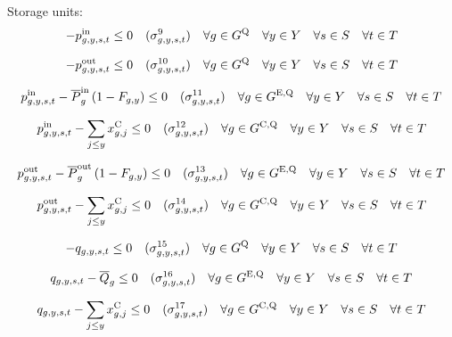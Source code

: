 \documentclass{article}
\newcommand{\sScenarioSets}{\quad \forall \iYear \in \sYears \quad \forall \iScenario \in \sScenarios \quad \forall \iInterval \in \sIntervals}
\begin{document}
Storage units:
\begin{equation}
	-\vPowerIn \leq 0 \quad (\dNonNegativeCharging) \quad \forall \iGenerator \in \sStorage \sScenarioSets
\end{equation}

\begin{equation}
	-\vPowerOut \leq 0 \quad (\dNonNegativeDischarging) \quad \forall \iGenerator \in \sStorage \sScenarioSets
\end{equation}

\begin{equation}
	\vPowerIn - \cPowerChargingMax \left(1 - \cRetirementIndicator\right) \leq 0 \quad (\dMaxChargingRateExisting) \quad \forall \iGenerator \in \sStorageExisting \sScenarioSets
\end{equation}

\begin{equation}
	\vPowerIn - \sum\limits_{\iYearAlias \leq \iYear} \vInstalledCapacity[\iGenerator,\iYearAlias] \leq 0 \quad (\dMaxChargingRateCandidate) \quad \forall \iGenerator \in \sStorageCandidate \sScenarioSets
\end{equation}

\begin{equation}
	\vPowerOut - \cPowerDischargingMax \left(1 - \cRetirementIndicator\right) \leq 0 \quad (\dMaxDischargingRateExisting) \quad \forall \iGenerator \in \sStorageExisting \sScenarioSets
\end{equation}

\begin{equation}
	\vPowerOut - \sum\limits_{\iYearAlias \leq \iYear} \vInstalledCapacity[\iGenerator,\iYearAlias] \leq 0 \quad (\dMaxDischargingRateCandidate) \quad \forall \iGenerator \in \sStorageCandidate \sScenarioSets
\end{equation}

\begin{equation}
	- \vStorageUnitEnergy \leq 0 \quad (\dNonNegativeStorageEnergy) \quad \forall \iGenerator \in \sStorage \sScenarioSets
\end{equation}

\begin{equation}
	\vStorageUnitEnergy - \cStorageUnitEnergyMax \leq 0 \quad (\dMaxStorageEnergyExisting) \quad \forall \iGenerator \in \sStorageExisting \sScenarioSets
\end{equation}

\begin{equation}
	\vStorageUnitEnergy - \sum\limits_{\iYearAlias \leq \iYear} \vInstalledCapacity[\iGenerator,\iYearAlias] \leq 0 \quad (\dMaxStorageEnergyCandidate) \quad \forall \iGenerator \in \sStorageCandidate \sScenarioSets
\end{equation}
\end{document}
